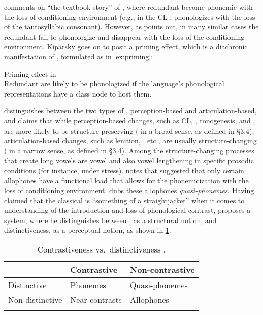 \documentclass[output=paper,
modfonts
]{LSP/langsci}
\begin{document}
\citet[328]{kiparsky2003} comments on ``the textbook story'' of
, where redundant  become phonemic with the loss
of conditioning environment (e.g., in the CL , 
phonologizes with the loss of the tautosyllabic consonant). However, as
\citet{kiparsky2003} points out, in many similar cases the redundant 
fail to phonologize and disappear with the loss of the conditioning
environment. Kiparsky goes on to posit a priming effect, which is a
diachronic manifestation of , formulated as in
\cref{ex:priming}:

\ea\label{ex:priming}Priming effect in  \citep[328]{kiparsky2003}\\
Redundant  are likely to be phonologized if the language's phonological representations have a class node to host them.
\z

\citet{kiparsky2003} distinguishes between the two types of ,
perception-based and articulation-based, and claims that while
perception-based changes, such as CL, , tonogenesis, and
, are more likely to be structure-preserving
( in a broad sense, as defined in \S3.4),
articulation-based changes, such as lenition, , etc., are usually
structure-changing ( in a narrow sense, as defined in
\S3.4). Among the structure-changing processes that create long
vowels are vowel  and also vowel lengthening in specific
prosodic conditions (for instance, under stress). \citet[329]{kiparsky2003}
notes that \citet[333--335]{korhonen1969} suggested that only certain
allophones have a functional load that allows for the phonemicization
with the loss of conditioning environment. \citet{korhonen1969} dubs these
allophones \emph{quasi-phonemes}. Having claimed that the classical
 is ``something of a straightjacket'' when it comes to
understanding of the introduction and loss of phonological contrast,
\citet{kiparsky2013k} proposes a system, where he distinguishes between
, as a structural notion, and distinctiveness, as a
perceptual notion, as shown in \cref{tab:contrast}.

\begin{table}
\caption{Contrastiveness vs.\ distinctiveness \citep{kiparsky2013k}.}
\label{tab:contrast}
\begin{tabular}{lll}
\lsptoprule
& Contrastive & Non-contrastive\tabularnewline
\midrule
Distinctive & Phonemes & Quasi-phonemes\tabularnewline
Non-distinctive & Near contrasts & Allophones\tabularnewline
\lspbottomrule
\end{tabular}
\end{table}
\end{document}
